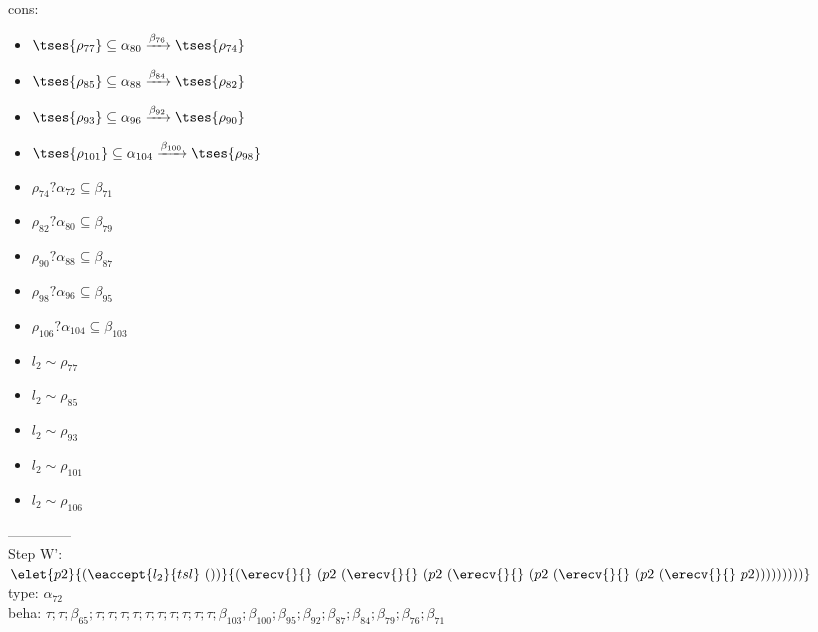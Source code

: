 \documentclass[12pt]{article}
\begin{document}
\\  cons: \begin{itemize}
\item $  \tses{ \rho_{77}} \subseteq \alpha_{80} \xrightarrow{\beta_{76}}  \tses{ \rho_{74}} $
\item $  \tses{ \rho_{85}} \subseteq \alpha_{88} \xrightarrow{\beta_{84}}  \tses{ \rho_{82}} $
\item $  \tses{ \rho_{93}} \subseteq \alpha_{96} \xrightarrow{\beta_{92}}  \tses{ \rho_{90}} $
\item $  \tses{ \rho_{101}} \subseteq \alpha_{104} \xrightarrow{\beta_{100}}  \tses{ \rho_{98}} $
\item $ \rho_{74}?\alpha_{72} \subseteq \beta_{71} $
\item $ \rho_{82}?\alpha_{80} \subseteq \beta_{79} $
\item $ \rho_{90}?\alpha_{88} \subseteq \beta_{87} $
\item $ \rho_{98}?\alpha_{96} \subseteq \beta_{95} $
\item $ \rho_{106}?\alpha_{104} \subseteq \beta_{103} $
\item $ l_{2} \sim\rho_{77} $
\item $ l_{2} \sim\rho_{85} $
\item $ l_{2} \sim\rho_{93} $
\item $ l_{2} \sim\rho_{101} $
\item $ l_{2} \sim\rho_{106} $
\end{itemize} 
  --------------\\ 
Step W': $ \elet{p2}{(\eaccept{ l_{2} }{tsl}~())}{(\erecv{}{}~(p2~(\erecv{}{}~(p2~(\erecv{}{}~(p2~(\erecv{}{}~(p2~(\erecv{}{}~p2)))))))))} $\\
  type: $ \alpha_{72} $ 
\\  beha: $ \tau; \tau; \beta_{65}; \tau; \tau; \tau; \tau; \tau; \tau; \tau; \tau; \tau; \tau; \beta_{103}; \beta_{100}; \beta_{95}; \beta_{92}; \beta_{87}; \beta_{84}; \beta_{79}; \beta_{76}; \beta_{71} $ 
\end{document}
